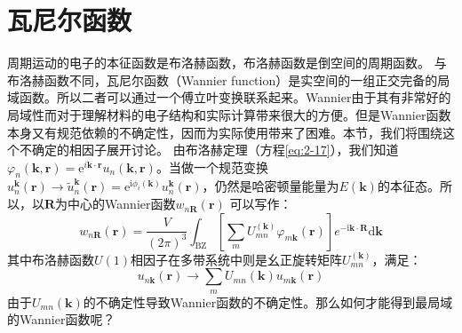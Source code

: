 \section{瓦尼尔函数}
周期运动的电子的本征函数是布洛赫函数，布洛赫函数是倒空间的周期函数。
与布洛赫函数不同，瓦尼尔函数（Wannier function）\citep{Wannier,wf1,wf2}是实空间的一组正交完备的局域函数。所以二者可以通过一个傅立叶变换联系起来。Wannier由于其有非常好的局域性而对于理解材料的电子结构和实际计算带来很大的方便。但是Wannier函数本身又有规范依赖的不确定性，因而为实际使用带来了困难。本节，我们将围绕这个不确定的相因子展开讨论。
由布洛赫定理（方程\ref{eq:2-17}），我们知道$\varphi_{n}(\mathbf{k}, \mathbf{r})=\mathrm{e}^{i \mathbf{k} \cdot \mathbf{r}} u_{n}(\mathbf{k}, \mathbf{r})$。当做一个规范变换
$u_{n}^{\mathbf{k}}(\mathbf{r}) \rightarrow \tilde{u}_{n}^{\mathbf{k}}(\mathbf{r})=\mathrm{e}^{\mathrm{i} \phi_{i}(\mathbf{k})} u_{n}^{\mathbf{k}}(\mathbf{r})$，仍然是哈密顿量能量为$E(\mathbf{k})$的本征态。所以，以$\mathbf{R}$为中心的Wannier函数$w_{n\mathbf{R}}(\mathbf{r})$ 可以写作：
\begin{equation}
    \label{eq:2-19}
    w_{n \mathbf{R}}(\mathbf{r})=\frac{V}{(2 \pi)^{3}} \int_{\mathrm{BZ}}\left[\sum_{m} U_{m n}^{(\mathbf{k})} \varphi_{m \mathbf{k}}(\mathbf{r})\right] e^{-\mathrm{i} \mathbf{k} \cdot \mathbf{R}} \mathrm{d} \mathbf{k}
\end{equation}
其中布洛赫函数$U(1)$相因子在多带系统中则是幺正旋转矩阵$U_{m n}^{(\mathbf{k})}$，满足：
\begin{equation}
    \label{eq:2-20}
    u_{n \mathbf{k}}(\mathbf{r}) \rightarrow \sum_{m} U_{m n}(\mathbf{k}) u_{m \mathbf{k}}(\mathbf{r})
\end{equation}
由于$U_{m n}(\mathbf{k})$的不确定性导致Wannier函数的不确定性。那么如何才能得到最局域的Wannier函数呢？

